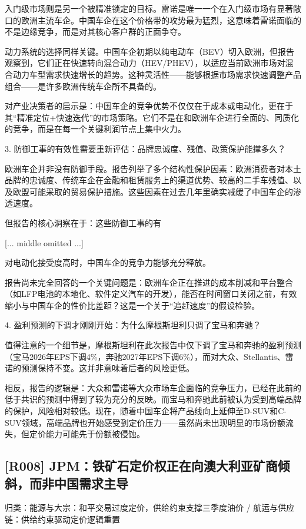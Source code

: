 \documentclass[11pt]{ctexart}
\begin{document}
入门级市场则是另一个被精准锁定的目标。雷诺是唯一一个在入门级市场有显著敞口的欧洲主流车企。中国车企在这个价格带的攻势最为猛烈，这意味着雷诺面临的不是边缘竞争，而是对其核心客户群的正面争夺。

动力系统的选择同样关键。中国车企初期以纯电动车（BEV）切入欧洲，但报告观察到，它们正在快速转向混合动力（HEV/PHEV），以适应当前欧洲市场对混合动力车型需求快速增长的趋势。这种灵活性——能够根据市场需求快速调整产品组合——是许多欧洲传统车企所不具备的。

对产业决策者的启示是：中国车企的竞争优势不仅仅在于成本或电动化，更在于其“精准定位+快速迭代”的市场策略。它们不是在和欧洲车企进行全面的、同质化的竞争，而是在每一个关键利润节点上集中火力。

3. 防御工事的有效性需要重新评估：品牌忠诚度、残值、政策保护能撑多久？

欧洲车企并非没有防御手段。报告列举了多个结构性保护因素：欧洲消费者对本土品牌的忠诚度、传统车企在金融和租赁服务上的渠道优势、较高的二手车残值、以及欧盟可能采取的贸易保护措施。这些因素在过去几年里确实减缓了中国车企的渗透速度。

但报告的核心洞察在于：这些防御工事的有

[... middle omitted ...]

对电动化接受度高时，中国车企的竞争力能够充分释放。

报告尚未完全回答的一个关键问题是：欧洲车企正在推进的成本削减和平台整合（如LFP电池的本地化、软件定义汽车的开发），能否在时间窗口关闭之前，有效缩小与中国车企的性价比差距？这是一个关于“追赶速度”的假设检验。

4. 盈利预测的下调才刚刚开始：为什么摩根斯坦利只调了宝马和奔驰？

值得注意的一个细节是，摩根斯坦利在此次报告中仅下调了宝马和奔驰的盈利预测（宝马2026年EPS下调4\%，奔驰2027年EPS下调6\%），而对大众、Stellantis、雷诺的预测保持不变。这并非意味着后者的风险更低。

相反，报告的逻辑是：大众和雷诺等大众市场车企面临的竞争压力，已经在此前的低于共识的预测中得到了较为充分的反映。而宝马和奔驰此前被认为受到高端品牌的保护，风险相对较低。现在，随着中国车企将产品线向上延伸至D-SUV和C-SUV领域，高端品牌也开始感受到定价压力——虽然尚未出现明显的市场份额流失，但定价能力可能先于份额被侵蚀。

\subsection{[R008] JPM：铁矿石定价权正在向澳大利亚矿商倾斜，而非中国需求主导}
{\small\color{refgray}归类：能源与大宗：和平交易过度定价，供给约束支撑三季度油价 / 航运与供应链：供给约束驱动定价逻辑重置}
\end{document}
